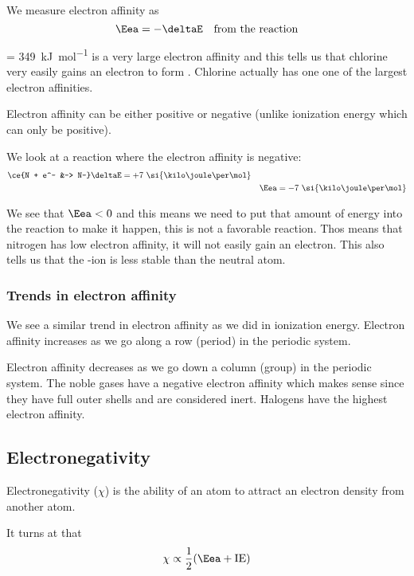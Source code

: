 \documentclass[../mit-general-chemistry.tex]{subfiles}
\begin{document}
We measure electron affinity as
\begin{equation*}
  \Eea = - \deltaE\quad\text{from the reaction}
\end{equation*}

\Eea = \SI{349}{\kilo\joule\per\mol} is a very large electron affinity
and this tells us that chlorine very easily gains an electron to form
. Chlorine actually has one one of the largest electron
affinities.

Electron affinity can be either positive or negative (unlike
ionization energy which can only be positive).

We look at a reaction where the electron affinity is negative:
\begin{align*}
  \ce{N + e^- &-> N-} &\deltaE = +7~\si{\kilo\joule\per\mol} \\
  &&\Eea = -7~\si{\kilo\joule\per\mol} \\
\end{align*}

We see that $\Eea < 0$ and this means we need to put that amount of
energy into the reaction to make it happen, this is not a favorable
reaction. Thos means that nitrogen has low electron affinity, it will
not easily gain an electron. This also tells us that the -ion
is less stable than the neutral atom.


\subsubsection{Trends in electron affinity}

We see a similar trend in electron affinity as we did in ionization
energy. Electron affinity increases as we go along a row (period) in
the periodic system.

Electron affinity decreases as we go down a column (group) in the
periodic system. The noble gases have a negative electron affinity
which makes sense since they have full outer shells and are considered
inert. Halogens have the highest electron affinity.






\subsection{Electronegativity}


Electronegativity ($\chi$) is the ability of an atom to attract an electron
density from another atom.

It turns at that
\begin{equation*}
  \chi \propto \frac{1}{2}(\Eea + \text{IE})
\end{equation*}
\end{document}
